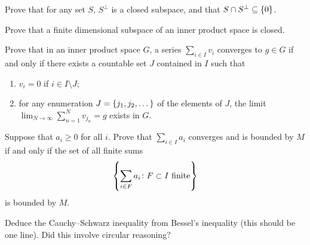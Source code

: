 \documentclass[11pt,a4paper]{article}
\begin{document}
\begin{exercise}
  Prove that for any set $S$, $S^{\perp}$ is a closed subspace,
  and that $S \cap S^{\perp} \subseteq \left\{0\right\}$.
\end{exercise}
\begin{solution}

\end{solution}

\begin{exercise}
  Prove that a finite dimensional subspace of an inner product space is
  closed.
\end{exercise}
\begin{solution}

\end{solution}

\begin{exercise}
  Prove that in an inner product space $G$,
  a series $\sum_{i \in I} v_i$ converges to $g \in G$ if
  and only if there exists a countable set $J$ contained in $I$ such that
  \begin{enumerate}
    \item[(a)] $v_i = 0$ if $i \in I \setminus J$;
    \item[(b)] for any enumeration $J = \left\{j_1,j_2,\dots\right\}$ of the elements
      of $J$, the limit $\lim_{N \to \infty} \sum_{n=1}^{N} v_{j_n} = g$
      exists in $G$.
  \end{enumerate}
\end{exercise}
\begin{solution}

\end{solution}

\begin{exercise}
  Suppose that $a_i \geq 0$ for all $i$.
  Prove that $\sum_{i \in I} a_i$ converges and is bounded
  by $M$ if and only if the set of all finite sums
  \[
    \left\{\sum_{i \in F} a_i \colon F \subset I \text{ finite}\right\}
  \]
  is bounded by $M$.
\end{exercise}
\begin{solution}

\end{solution}

\begin{exercise}
  Deduce the Cauchy--Schwarz inequality from Bessel's inequality
  (this should be one line).
  Did this involve circular reasoning?
\end{exercise}
\begin{solution}

\end{solution}
\end{document}

